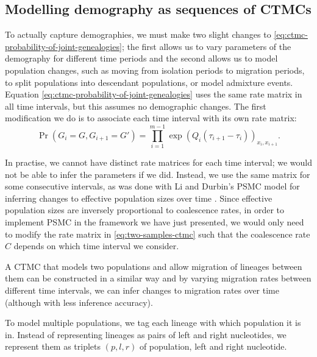 \documentclass[graybox]{svmult}
\begin{document}
\subsection{Modelling demography as sequences of CTMCs}

To actually capture demographies, we must make two slight changes to \eqref{eq:ctmc-probability-of-joint-genealogies}; the first allows us to vary parameters of the demography for different time periods and the second allows us to model population changes, such as moving from isolation periods to migration periods, to split populations into descendant populations, or model admixture events. Equation \eqref{eq:ctmc-probability-of-joint-genealogies} uses the same rate matrix in all time intervals, but this assumes no demographic changes. The first modification we do is to associate each time interval with its own rate matrix:
\begin{equation}
	\Pr(G_i=G,G_{i+1}=G') =
	\prod_{i=1}^{m-1} \exp\left(Q_i\left(\tau_{i+1}-\tau_i\right)\right)_{x_i,x_{i+1}}
	.
\end{equation}

In practise, we cannot have distinct rate matrices for each time interval; we would not be able to infer the parameters if we did. Instead, we use the same matrix for some consecutive intervals, as was done with Li and Durbin's PSMC model for inferring changes to effective population sizes over time \cite{Li:2011eza}. Since effective population sizes are inversely proportional to coalescence rates, in order to implement PSMC in the framework we have just presented, we would only need to modify the rate matrix in \eqref{eq:two-samples-ctmc} such that the coalescence rate $C$ depends on which time interval we consider.

A CTMC that models two populations and allow migration of lineages between them can be constructed in a similar way \cite{Mailund:2012ewa} and by varying migration rates between different time intervals, we can infer changes to migration rates over time \cite{Cheng:2015kia} (although with less inference accuracy). 

To model multiple populations, we tag each lineage with which population it is in. Instead of representing lineages as pairs of left and right nucleotides, we represent them as triplets $(p,l,r)$ of population, left and right nucleotide.
\end{document}
